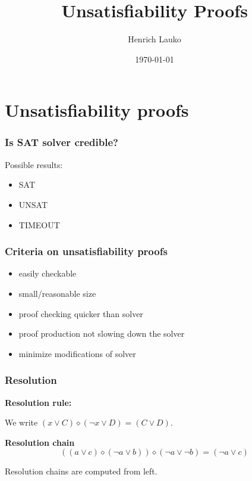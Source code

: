 \documentclass[xcolor=dvipsnames]{beamer}
\title{Unsatisfiability Proofs}
\author{Henrich Lauko \vspace{-0.3cm}}
\institute{IA072 -- Seminar on Concurrency \vspace{1cm}}
\date{\today}
\let\otp\titlepage
\renewcommand{\titlepage}{\otp\addtocounter{framenumber}{-1}}
\begin{document}
\begin{frame}[plain]
 \titlepage
\end{frame}

\section{Unsatisfiability proofs}
\begin{frame}
  \frametitle{Is SAT solver credible?}
    Possible results:
    \begin{itemize}
        \item SAT
        \item UNSAT
        \item TIMEOUT
    \end{itemize}
\end{frame}

\begin{frame}
  \frametitle{Criteria on unsatisfiability proofs}
    \begin{itemize}[<+->]
        \item easily checkable
        \item small/reasonable size
        \item proof checking quicker than solver
        \item proof production not slowing down the solver
        \item minimize modifications of solver
    \end{itemize}
\end{frame}

\begin{frame}
  \frametitle{Resolution}
  \textbf{Resolution rule:}
  \begin{mathpar}  \end{mathpar}

  We write $(x \vee C) \diamond ( \neg x \vee D) = (C \vee D)$.

  \pause
  \bigskip
  \textbf{Resolution chain}
  \[
      ((a \vee c) \diamond (\neg a \vee b)) \diamond (\neg a \vee \neg b) = (\neg a \vee c)
  \]

  Resolution chains are computed from left.
\end{frame}
\end{document}
